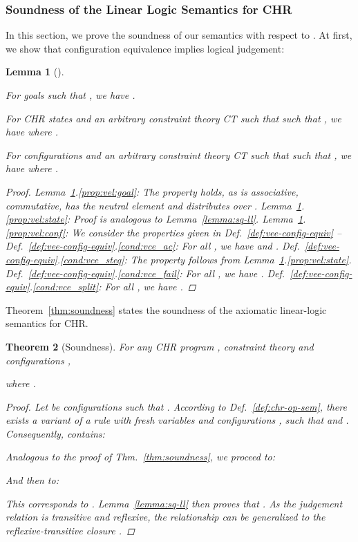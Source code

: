 \documentclass[acmtocl]{acmtrans2m}
\newtheorem{theorem}{Theorem}[section]
\newtheorem{lemma}[theorem]{Lemma}
\begin{document}
\subsubsection{Soundness of the Linear Logic Semantics for CHR}

In this section, we prove the soundness of our semantics with respect to
. At first, we show that configuration equivalence implies logical
judgement:

\begin{lemma}[]
\label{lemma:vee-ce-ll}
\begin{longenum}
 \item \label{prop:vel:goal} For goals  such that ,
 we have .
 \item \label{prop:vel:state} For CHR states  and an arbitrary
 constraint theory CT such that such that ,
 we have  where .
 \item \label{prop:vel:conf} For configurations  and an arbitrary
 constraint theory CT such that such that , we have  where .
\end{longenum}
\begin{proof}
  Lemma~\ref{lemma:vee-ce-ll}.\ref{prop:vel:goal}: The property holds,
  as  is associative, commutative, has the neutral element  and
  distributes over .
  Lemma~\ref{lemma:vee-ce-ll}.\ref{prop:vel:state}: Proof is analogous
  to Lemma~\ref{lemma:sq-ll}.
  Lemma~\ref{lemma:vee-ce-ll}.\ref{prop:vel:conf}: We consider the properties
  given in Def.~\ref{def:vee-config-equiv} --
	Def.~\ref{def:vee-config-equiv}.\ref{cond:vce_ac}: For all ,
	we have  and
	.
	Def.~\ref{def:vee-config-equiv}.\ref{cond:vce_steq}: The property follows from Lemma~\ref{lemma:vee-ce-ll}.\ref{prop:vel:state}.
	Def.~\ref{def:vee-config-equiv}.\ref{cond:vce_fail}: For all , we have .
	Def.~\ref{def:vee-config-equiv}.\ref{cond:vce_split}: For all , we have .
\end{proof}

\end{lemma}

Theorem~\ref{thm:soundness} states the soundness of the axiomatic linear-logic
semantics for CHR.

\begin{theorem}[Soundness]
  \label{thm:vee-soundness}
  For any CHR program , constraint theory  and configurations ,
  
  where .
\begin{proof}
Let  be configurations such that . According to
Def.~\ref{def:chr-op-sem}, there exists a variant of a rule with fresh variables
 and configurations
,   such that  and .
Consequently,  contains:

Analogous to the proof of Thm.~\ref{thm:soundness}, we proceed to:

And then to:

This corresponds to . Lemma~\ref{lemma:sq-ll} then
proves that . As the judgement relation
 is transitive and reflexive, the relationship can be generalized
to the reflexive-transitive closure .
\end{proof}
\end{theorem}
\end{document}
